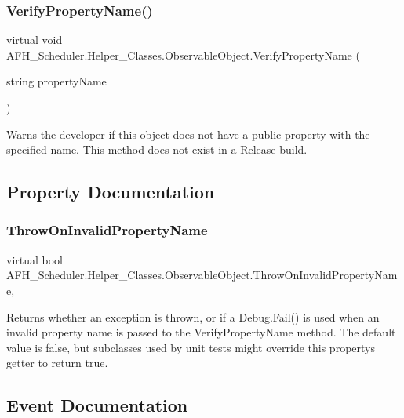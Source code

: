 \subsubsection{VerifyPropertyName()}
{\footnotesize\ttfamily virtual void A\+F\+H\+\_\+\+Scheduler.\+Helper\+\_\+\+Classes.\+Observable\+Object.\+Verify\+Property\+Name (\begin{DoxyParamCaption}\item[{string}]{property\+Name }\end{DoxyParamCaption})\hspace{0.3cm}{\ttfamily [virtual]}}



Warns the developer if this object does not have a public property with the specified name. This method does not exist in a Release build. 



\subsection{Property Documentation}
\mbox{\label{class_a_f_h___scheduler_1_1_helper___classes_1_1_observable_object_a07b41b9e4ddf03f2dc031cdce854eee5}} 
\subsubsection{ThrowOnInvalidPropertyName}
{\footnotesize\ttfamily virtual bool A\+F\+H\+\_\+\+Scheduler.\+Helper\+\_\+\+Classes.\+Observable\+Object.\+Throw\+On\+Invalid\+Property\+Name\hspace{0.3cm}{\ttfamily [get]}, {\ttfamily [protected]}}



Returns whether an exception is thrown, or if a Debug.\+Fail() is used when an invalid property name is passed to the Verify\+Property\+Name method. The default value is false, but subclasses used by unit tests might override this property\textquotesingle{}s getter to return true. 



\subsection{Event Documentation}
\mbox{\label{class_a_f_h___scheduler_1_1_helper___classes_1_1_observable_object_ad081083858a319387cad74c739ebc339}} 
